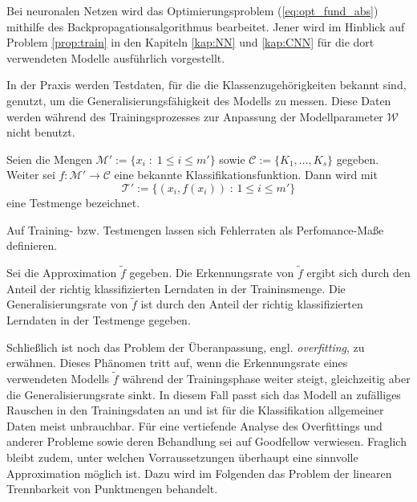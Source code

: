 Bei neuronalen Netzen wird das Optimierungsproblem (\ref{eq:opt_fund_abs}) mithilfe des Backpropagationsalgorithmus bearbeitet. Jener wird im Hinblick auf Problem \ref{prop:train} in den Kapiteln \ref{kap:NN} und \ref{kap:CNN} für die dort verwendeten Modelle ausführlich vorgestellt. 

In der Praxis werden Testdaten, für die die Klassenzugehörigkeiten bekannt sind, genutzt, um die Generalisierungsfähigkeit des Modells zu messen. Diese Daten werden während des Trainingsprozesses zur Anpassung der Modellparameter $\mathcal{W}$ nicht benutzt.

\begin{defi}[Testmenge]
    Seien die Mengen $\mathcal{M}':=\{x_i \; : \; 1 \leq i \leq m'\}$ sowie $\mathcal{C}:=\{K_1, \ldots, K_s \}$ gegeben. Weiter sei $f: \mathcal{M}' \rightarrow \mathcal{C}$ eine bekannte Klassifikationsfunktion. Dann wird mit 
    \begin{equation}
        \label{eq:testset}
        \mathcal{T}':=\{(x_i, f(x_i))\; : \, 1 \leq i \leq m'\}
    \end{equation}
    eine Testmenge bezeichnet.
\end{defi}
Auf Training- bzw. Testmengen lassen sich Fehlerraten als Perfomance-Maße definieren.

\begin{defi}
    Sei die Approximation $\tilde{f}$ gegeben.
    Die Erkennungsrate von $\tilde{f}$ ergibt sich durch den Anteil der richtig klassifizierten Lerndaten in der Traininsmenge. Die Generalisierungsrate von $\tilde{f}$ ist durch den Anteil der richtig klassifizierten Lerndaten in der Testmenge gegeben.
\end{defi}

Schließlich ist noch das Problem der Überanpassung, engl. \textit{overfitting}, zu erwähnen. Dieses Phänomen tritt auf, wenn die Erkennungsrate eines verwendeten Modells $\tilde{f}$ während der Trainingsphase weiter steigt, gleichzeitig aber die Generalisierungsrate sinkt. In diesem Fall passt sich das Modell an zufälliges Rauschen in den Trainingsdaten an und ist für die Klassifikation allgemeiner Daten meist unbrauchbar. Für eine vertiefende Analyse des Overfittings und anderer Probleme sowie deren Behandlung sei auf Goodfellow\cite{Goodfellow-et-al-2016} verwiesen.
Fraglich bleibt zudem, unter welchen Vorraussetzungen überhaupt eine sinnvolle Approximation möglich ist. Dazu wird im Folgenden das Problem der linearen Trennbarkeit von Punktmengen behandelt.
